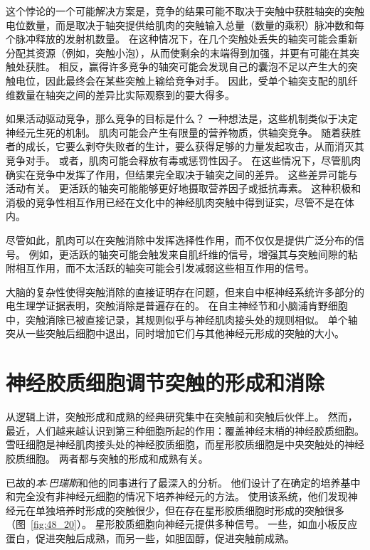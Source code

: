这个悖论的一个可能解决方案是，竞争的结果可能不取决于突触中获胜轴突的突触电位数量，而是取决于轴突提供给肌肉的突触输入总量（数量的乘积）脉冲数和每个脉冲释放的发射机数量。
在这种情况下，在几个突触处丢失的轴突可能会重新分配其资源（例如，突触小泡），从而使剩余的末端得到加强，并更有可能在其突触处获胜。
相反，赢得许多竞争的轴突可能会发现自己的囊泡不足以产生大的突触电位，因此最终会在某些突触上输给竞争对手。
因此，受单个轴突支配的肌纤维数量在轴突之间的差异比实际观察到的要大得多。


如果活动驱动竞争，那么竞争的目标是什么？
一种想法是，这些机制类似于决定神经元生死的机制。
肌肉可能会产生有限量的营养物质，供轴突竞争。
随着获胜者的成长，它要么剥夺失败者的生计，要么获得足够的力量发起攻击，从而消灭其竞争对手。
或者，肌肉可能会释放有毒或惩罚性因子。
在这些情况下，尽管肌肉确实在竞争中发挥了作用，但结果完全取决于轴突之间的差异。
这些差异可能与活动有关。
更活跃的轴突可能能够更好地摄取营养因子或抵抗毒素。
这种积极和消极的竞争性相互作用已经在文化中的神经肌肉突触中得到证实，尽管不是在体内。


尽管如此，肌肉可以在突触消除中发挥选择性作用，而不仅仅是提供广泛分布的信号。
例如，更活跃的轴突可能会触发来自肌纤维的信号，增强其与突触间隙的粘附相互作用，而不太活跃的轴突可能会引发减弱这些相互作用的信号。


大脑的复杂性使得突触消除的直接证明存在问题，但来自中枢神经系统许多部分的电生理学证据表明，突触消除是普遍存在的。
在自主神经节和小脑浦肯野细胞中，突触消除已被直接记录，其规则似乎与神经肌肉接头处的规则相似。
单个轴突从一些突触后细胞中退出，同时增加它们与其他神经元形成的突触的大小。



\section{神经胶质细胞调节突触的形成和消除}

从逻辑上讲，突触形成和成熟的经典研究集中在突触前和突触后伙伴上。
然而，最近，人们越来越认识到第三种细胞所起的作用：覆盖神经末梢的神经胶质细胞。
雪旺细胞是神经肌肉接头处的神经胶质细胞，而星形胶质细胞是中央突触处的神经胶质细胞。
两者都与突触的形成和成熟有关。


已故的\textit{本$\cdot$巴瑞斯}和他的同事进行了最深入的分析。
他们设计了在确定的培养基中和完全没有非神经元细胞的情况下培养神经元的方法。
使用该系统，他们发现神经元在单独培养时形成的突触很少，但在存在星形胶质细胞时形成的突触很多（图~\ref{fig:48_20}）。
星形胶质细胞向神经元提供多种信号。
一些，如血小板反应蛋白，促进突触后成熟，而另一些，如胆固醇，促进突触前成熟。


